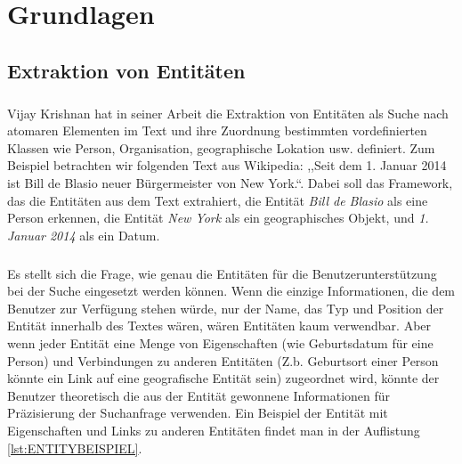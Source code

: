 \chapter{Grundlagen}
\label{sec:Grundlagen}

\section{Extraktion von Entitäten}
\paragraph{}
Vijay Krishnan hat in seiner Arbeit\cite{Vijay/Vignesh:05} die Extraktion von Entitäten als Suche nach atomaren Elementen im Text und ihre Zuordnung bestimmten vordefinierten Klassen wie Person, Organisation, geographische Lokation usw. definiert. Zum Beispiel betrachten wir folgenden Text aus Wikipedia: ,,Seit dem 1. Januar 2014 ist Bill de Blasio neuer Bürgermeister von New York.``. Dabei soll das Framework, das die Entitäten aus dem Text extrahiert, die Entität \textit{Bill de Blasio} als eine Person erkennen, die Entität \textit{New York} als ein geographisches Objekt, und \textit{1. Januar 2014} als ein Datum.

\lstset{language=java}


\paragraph{}
Es stellt sich die Frage, wie genau die Entitäten für die Benutzerunterstützung bei der Suche eingesetzt werden können. Wenn die einzige Informationen, die dem Benutzer zur Verfügung stehen würde, nur der Name, das Typ und Position der Entität innerhalb des Textes wären, wären Entitäten kaum verwendbar. Aber wenn jeder Entität eine Menge von Eigenschaften (wie Geburtsdatum für eine Person) und Verbindungen zu anderen Entitäten (Z.b. Geburtsort einer Person könnte ein Link auf eine geografische Entität sein) zugeordnet wird, könnte der Benutzer theoretisch die aus der Entität gewonnene Informationen für Präzisierung der Suchanfrage verwenden. Ein Beispiel der Entität mit Eigenschaften und Links zu anderen Entitäten findet man in der Auflistung \ref{lst:ENTITYBEISPIEL}.

